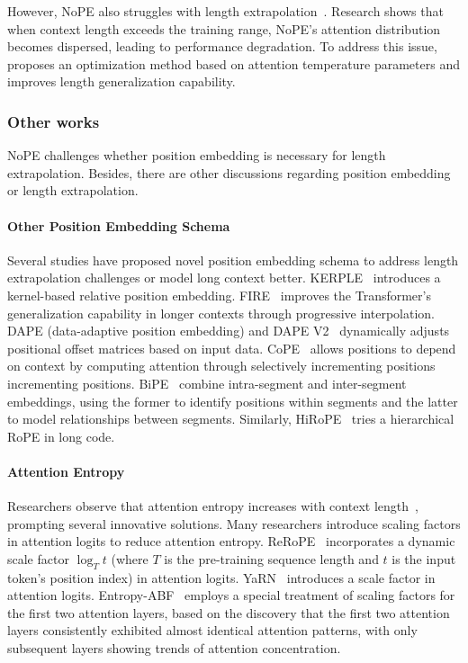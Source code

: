 However, NoPE also struggles with length extrapolation~\citep{kazemnejad2024impact, wang2024length}. Research shows that when context length exceeds the training range, NoPE's attention distribution becomes dispersed, leading to performance degradation. To address this issue, \citet{wang2024length} proposes an optimization method based on attention temperature parameters and improves length generalization capability.

\subsubsection{Other works}
NoPE challenges whether position embedding is necessary for length extrapolation. Besides, there are other discussions regarding position embedding or length extrapolation. 

\paragraph{Other Position Embedding Schema} Several studies have proposed novel position embedding schema to address length extrapolation challenges or model long context better. KERPLE~\citep{chi2022kerple} introduces a kernel-based relative position embedding. FIRE~\citep{li2023functional} improves the Transformer's generalization capability in longer contexts through progressive interpolation. DAPE (data-adaptive position embedding) and DAPE V2~\citep{zheng2024dape, zheng2024dape2} dynamically adjusts positional offset matrices based on input data. CoPE~\citep{golovneva2024contextual} allows positions to depend on context by computing attention through selectively incrementing positions incrementing positions. BiPE~\citep{dong2024exploring} combine intra-segment and inter-segment embeddings, using the former to identify positions within segments and the latter to model relationships between segments. Similarly, HiRoPE~\citep{zhang2024hirope} tries a hierarchical RoPE in long code.

\paragraph{Attention Entropy} Researchers observe that attention entropy increases with context length~\citep{han2024lm,pengyarn}, prompting several innovative solutions. Many researchers introduce scaling factors in attention logits to reduce attention entropy. ReRoPE~\citep{rerope} incorporates a dynamic scale factor $\log_Tt$ (where $T$ is the pre-training sequence length and $t$ is the input token's position index) in attention logits. YaRN~\citep{pengyarn} introduces a scale factor in attention logits. Entropy-ABF~\citep{zhang2024extending} employs a special treatment of scaling factors for the first two attention layers, based on the discovery that the first two attention layers consistently exhibited almost identical attention patterns, with only subsequent layers showing trends of attention concentration.

